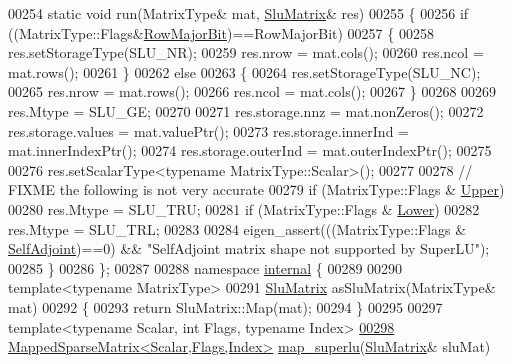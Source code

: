 \begin{DoxyCode}
00254   \textcolor{keyword}{static} \textcolor{keywordtype}{void} run(MatrixType& mat, \hyperlink{struct_eigen_1_1_slu_matrix}{SluMatrix}& res)
00255   \{
00256     \textcolor{keywordflow}{if} ((MatrixType::Flags&\hyperlink{group__flags_gae4f56c2a60bbe4bd2e44c5b19cbe8762}{RowMajorBit})==RowMajorBit)
00257     \{
00258       res.setStorageType(SLU\_NR);
00259       res.nrow      = mat.cols();
00260       res.ncol      = mat.rows();
00261     \}
00262     \textcolor{keywordflow}{else}
00263     \{
00264       res.setStorageType(SLU\_NC);
00265       res.nrow      = mat.rows();
00266       res.ncol      = mat.cols();
00267     \}
00268 
00269     res.Mtype       = SLU\_GE;
00270 
00271     res.storage.nnz       = mat.nonZeros();
00272     res.storage.values    = mat.valuePtr();
00273     res.storage.innerInd  = mat.innerIndexPtr();
00274     res.storage.outerInd  = mat.outerIndexPtr();
00275 
00276     res.setScalarType<\textcolor{keyword}{typename} MatrixType::Scalar>();
00277 
00278     \textcolor{comment}{// FIXME the following is not very accurate}
00279     \textcolor{keywordflow}{if} (MatrixType::Flags & \hyperlink{group__enums_gga39e3366ff5554d731e7dc8bb642f83cda6bcb58be3b8b8ec84859ce0c5ac0aaec}{Upper})
00280       res.Mtype = SLU\_TRU;
00281     \textcolor{keywordflow}{if} (MatrixType::Flags & \hyperlink{group__enums_gga39e3366ff5554d731e7dc8bb642f83cda891792b8ed394f7607ab16dd716f60e6}{Lower})
00282       res.Mtype = SLU\_TRL;
00283 
00284     eigen\_assert(((MatrixType::Flags & \hyperlink{group__enums_gga39e3366ff5554d731e7dc8bb642f83cda2491fc6765056421f504eb7e16083e8f}{SelfAdjoint})==0) && \textcolor{stringliteral}{"SelfAdjoint matrix shape not
       supported by SuperLU"});
00285   \}
00286 \};
00287 
00288 \textcolor{keyword}{namespace }\hyperlink{namespaceinternal}{internal} \{
00289 
00290 \textcolor{keyword}{template}<\textcolor{keyword}{typename} MatrixType>
00291 \hyperlink{struct_eigen_1_1_slu_matrix}{SluMatrix} asSluMatrix(MatrixType& mat)
00292 \{
00293   \textcolor{keywordflow}{return} SluMatrix::Map(mat);
00294 \}
00295 
00297 \textcolor{keyword}{template}<\textcolor{keyword}{typename} Scalar, \textcolor{keywordtype}{int} Flags, \textcolor{keyword}{typename} Index>
\hyperlink{namespace_eigen_1_1internal_a3623dd66c579fac70fa26a40aae5061b}{00298} \hyperlink{class_eigen_1_1_mapped_sparse_matrix}{MappedSparseMatrix<Scalar,Flags,Index>} 
      \hyperlink{namespace_eigen_1_1internal_a3623dd66c579fac70fa26a40aae5061b}{map\_superlu}(\hyperlink{struct_eigen_1_1_slu_matrix}{SluMatrix}& sluMat)

\end{DoxyCode}
